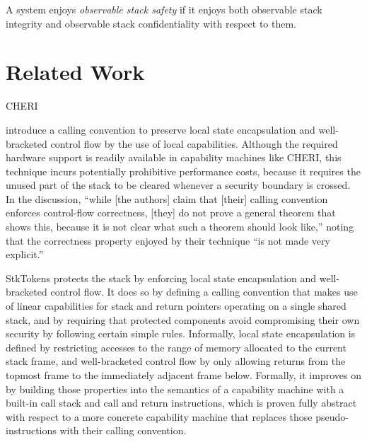 \documentclass[acmsmall,review,anonymous]{acmart}\settopmatter{printfolios=true,printccs=false,printacmref=false}
\begin{document}
{    %
    A system enjoys {\em observable stack safety}
    if it enjoys both observable stack integrity and
      observable stack confidentiality with respect to them.



\section{Related Work}
\label{sec:relwork}

CHERI 

\citet{Skorstengaard+19b} introduce a calling convention to preserve local state
encapsulation and well-bracketed control flow by the use of local capabilities.
Although the required hardware support is readily available in capability
machines like CHERI, this technique incurs potentially prohibitive performance
costs, because it requires the unused part of the stack to be cleared whenever a
security boundary is crossed. In the discussion, ``while [the authors] claim
that [their] calling convention enforces control-flow correctness, [they] do not
prove a general theorem that shows this, because it is not clear what such a
theorem should look like,'' noting that the correctness property enjoyed by
their technique ``is not made very explicit.''

StkTokens \citep{Skorstengaard+19} protects the stack by enforcing local state
encapsulation and well-bracketed control flow. It does so by defining a calling
convention that makes use of linear capabilities for stack and return pointers
operating on a single shared stack, and by requiring that protected components
avoid compromising their own security by following certain simple rules.
Informally, local state encapsulation is defined by restricting accesses to the
range of memory allocated to the current stack frame, and well-bracketed control
flow by only allowing returns from the topmost frame to the immediately adjacent
frame below. Formally, it improves on \citet{Skorstengaard+19b} by building
those properties into the semantics of a capability machine with a built-in call
stack and call and return instructions, which is proven fully abstract with
respect to a more concrete capability machine that replaces those
pseudo-instructions with their calling convention.


}
\end{document}
